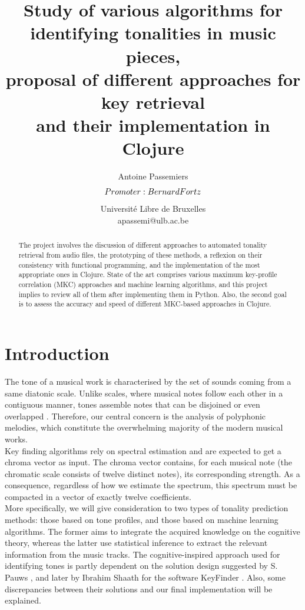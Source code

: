 \documentclass[letterpaper]{article}
\title{Study of various algorithms for identifying tonalities in music pieces, \\ proposal of different approaches for key retrieval \\ and their implementation in Clojure}
\author{Antoine Passemiers$$ \\
Promoter: Bernard Fortz\\
\mbox{}\\
$$Université Libre de Bruxelles \\
apassemi@ulb.ac.be}
\begin{document}
\maketitle

\renewcommand\bibname{References}        %
\renewcommand{\refname}{References}
\makeatletter
\renewcommand\@biblabel[1]{#1.  }
\makeatother

\setcounter{secnumdepth}{3}

\begin{abstract}
The project involves the discussion of different approaches to automated tonality retrieval from audio files,
the prototyping of these methods, a reflexion on their consistency with functional programming,
and the implementation of the most appropriate ones in Clojure.
State of the art comprises various maximum key-profile correlation (MKC) approaches and machine learning algorithms, and this
project implies to review all of them after implementing them in Python. Also, the second goal is to
assess the accuracy and speed of different MKC-based approaches in Clojure.
\end{abstract}

\section{Introduction}

The tone of a musical work is characterised by the set of sounds coming from a same diatonic scale.
Unlike scales, where musical notes follow each other in a contiguous manner, tones assemble notes that can be
disjoined or even overlapped \citep{AD}.
Therefore, our central concern is the analysis of polyphonic melodies, which constitute the overwhelming
majority of the modern musical works.\\

Key finding algorithms rely on spectral estimation and are expected to get a chroma vector as input. The chroma vector contains, for each musical note (the chromatic scale consists of twelve distinct notes), its corresponding strength. As a consequence, regardless of how we estimate the spectrum, this spectrum must be compacted in a vector of exactly twelve coefficients.\\

More specifically, we will give consideration to two types of tonality prediction methods:
those based on tone profiles, and those based on machine learning algorithms.
The former aims to integrate the acquired knowledge on the cognitive theory, whereas the latter
use statistical inference to extract the relevant information from the music tracks.
The cognitive-inspired approach used for identifying tones is partly dependent on the solution design suggested by S. Pauws \citep{SP}, and later by
Ibrahim Sha\textquotesingle ath for the software KeyFinder \citep{IS}. Also, some discrepancies between their solutions and our final implementation will be explained. \\
\end{document}
